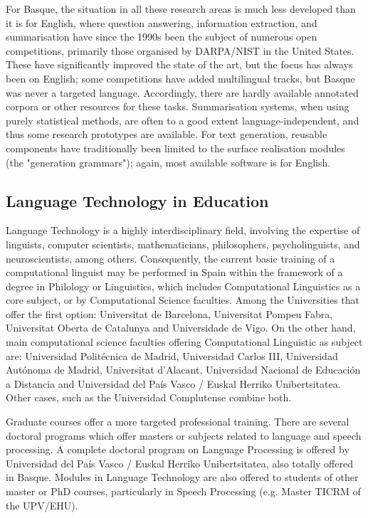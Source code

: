 \begin{multicols}{2}

For Basque, the situation in all these research areas is much less developed than it is for English, where question answering, information extraction, and summarisation have since the 1990s been the subject of numerous open competitions, primarily those organised by DARPA/NIST in the United States. These have significantly improved the state of the art, but the focus has always been on English; some competitions have added multilingual tracks, but Basque was never a targeted language. Accordingly, there are hardly available annotated corpora or other resources for these tasks. Summarisation systems, when using purely statistical methods, are often to a good extent language-independent, and thus some research prototypes are available. For text generation, reusable components have traditionally been limited to the surface realisation modules (the "generation grammars"); again, most available software is for English.

\subsection{Language Technology in Education}
   Language Technology is a highly interdisciplinary field, involving the expertise of linguists, computer scientists, mathematicians, philosophers, psycholinguists, and neuroscientists, among others. Consequently, the current basic training of a computational linguist may be performed in Spain within the framework of a degree in Philology or Linguistics, which includes Computational Linguistics as a core subject, or by Computational Science faculties. Among the Universities that offer the first option: Universitat de Barcelona, Universitat Pompeu Fabra, Universitat Oberta de Catalunya and Universidade de Vigo. On the other hand, main computational science faculties offering Computational Linguistic as subject are: Universidad Politécnica de Madrid, Universidad Carlos III, Universidad Autónoma de Madrid, Universitat d’Alacant, Universidad Nacional de Educación a Distancia and Universidad del País Vasco / Euskal Herriko Unibertsitatea. Other cases, such as the Universidad Complutense combine both.

Graduate courses offer a more targeted professional training. There are several doctoral programs which offer masters or subjects related to language and speech processing. A complete doctoral program on Language Processing is offered by Universidad del País Vasco / Euskal Herriko Unibertsitatea, also totally offered in Basque. Modules in Language Technology are also offered to students of other master or PhD courses, particularly in Speech Processing (e.g. Master TICRM of the UPV/EHU). 


\end{multicols}
